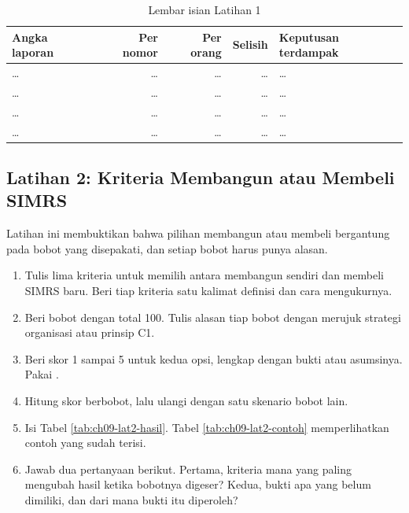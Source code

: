\begin{table}[!htb]
  \centering
  \caption{Lembar isian Latihan 1}
  \label{tab:ch09-lat1-hasil}
  \small
  \begin{tabularx}{\textwidth}{Xrrrl}
    \hline
    \textbf{Angka laporan} & \textbf{Per nomor} & \textbf{Per orang} & \textbf{Selisih} & \textbf{Keputusan terdampak} \\
    \hline
    \dots & \dots & \dots & \dots & \dots \\
    \hline
    \dots & \dots & \dots & \dots & \dots \\
    \hline
    \dots & \dots & \dots & \dots & \dots \\
    \hline
    \dots & \dots & \dots & \dots & \dots \\
    \hline
  \end{tabularx}
\end{table}

\subsection*{Latihan 2: Kriteria Membangun atau Membeli SIMRS}

Latihan ini membuktikan bahwa pilihan membangun atau membeli bergantung pada
bobot yang disepakati, dan setiap bobot harus punya alasan.

\begin{enumerate}
  \item Tulis lima kriteria untuk memilih antara membangun sendiri dan
        membeli SIMRS baru. Beri tiap kriteria satu kalimat definisi dan cara
        mengukurnya.
  \item Beri bobot dengan total 100. Tulis alasan tiap bobot dengan merujuk
        strategi organisasi atau prinsip C1.
  \item Beri skor 1 sampai 5 untuk kedua opsi, lengkap dengan bukti atau
        asumsinya. Pakai
        .
  \item Hitung skor berbobot, lalu ulangi dengan satu skenario bobot lain.
  \item Isi Tabel \ref{tab:ch09-lat2-hasil}. Tabel \ref{tab:ch09-lat2-contoh}
        memperlihatkan contoh yang sudah terisi.
  \item Jawab dua pertanyaan berikut. Pertama, kriteria mana yang paling
        mengubah hasil ketika bobotnya digeser? Kedua, bukti apa yang belum
        dimiliki, dan dari mana bukti itu diperoleh?
\end{enumerate}

